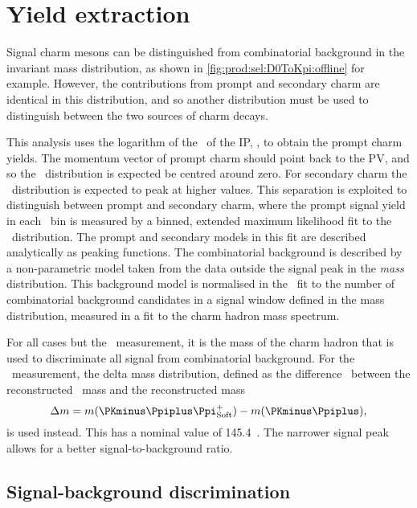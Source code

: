 \chapter{Yield extraction}
\label{chap:prod:fitting}

Signal charm mesons can be distinguished from combinatorial background in the 
invariant mass distribution, as shown in \cref{fig:prod:sel:D0ToKpi:offline} 
for example.
However, the contributions from prompt and secondary charm are identical in 
this distribution, and so another distribution must be used to distinguish 
between the two sources of charm decays.

This analysis uses the logarithm of the \chisq\ of the \acl{IP}, \lnipchisq, to 
obtain the prompt charm yields.
The momentum vector of prompt charm should point back to the \ac{PV}, and so 
the \lnipchisq\ distribution is expected be centred around zero.
For secondary charm the \lnipchisq\ distribution is expected to peak at higher 
values.
This separation is exploited to distinguish between prompt and secondary charm, 
where the prompt signal yield in each \pTy\ bin is measured by a binned, 
extended maximum likelihood fit to the \lnipchisq\ distribution.
The prompt and secondary models in this fit are described analytically as 
peaking functions.
The combinatorial background is described by a non-parametric model taken from 
the data outside the signal peak in the \emph{mass} distribution.
This background model is normalised in the \lnipchisq\ fit to the number of 
combinatorial background candidates in a signal window defined in the mass 
distribution, measured in a fit to the charm hadron mass spectrum.

For all cases but the \PDstarp\ measurement, it is the mass of the charm hadron 
that is used to discriminate all signal from combinatorial background.
For the \PDstarp\ measurement, the delta mass distribution, defined as the 
difference \deltam\ between the reconstructed \PDstarp\ mass and the 
reconstructed \PDzero mass
\begin{equation}
  \deltam = m(\PKminus\Ppiplus\Ppiplussoft) - m(\PKminus\Ppiplus),
  \label{eqn:prod:fitting:delta_mass}
\end{equation}
is used instead.
This has a nominal value of \SI{145.4}{\MeVcc}~\cite{PDG2014}.
The narrower signal peak allows for a better signal-to-background ratio.

\section{Signal-background discrimination}
\label{chap:prod:fitting:mass}

